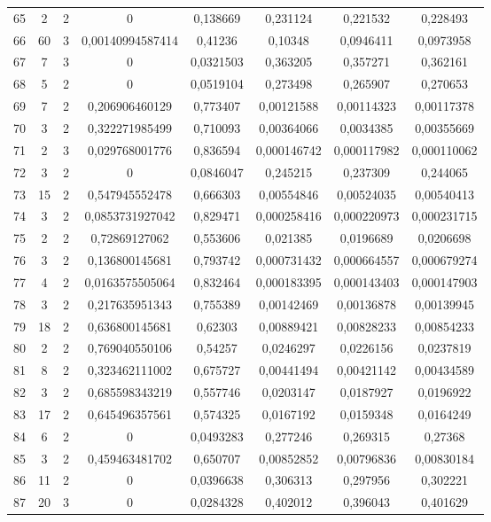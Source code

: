 \begin{longtable}{|c|c|c|c|c|c|c|c|}
65 & 2 & 2 & 0 & 0,138669 & 0,231124 & 0,221532 & 0,228493  \\
66 & 60 & 3 & 0,00140994587414 & 0,41236 & 0,10348 & 0,0946411 & 0,0973958  \\
67 & 7 & 3 & 0 & 0,0321503 & 0,363205 & 0,357271 & 0,362161  \\
68 & 5 & 2 & 0 & 0,0519104 & 0,273498 & 0,265907 & 0,270653  \\
69 & 7 & 2 & 0,206906460129 & 0,773407 & 0,00121588 & 0,00114323 & 0,00117378  \\
70 & 3 & 2 & 0,322271985499 & 0,710093 & 0,00364066 & 0,0034385 & 0,00355669  \\
71 & 2 & 3 & 0,029768001776 & 0,836594 & 0,000146742 & 0,000117982 & 0,000110062  \\
72 & 3 & 2 & 0 & 0,0846047 & 0,245215 & 0,237309 & 0,244065  \\
73 & 15 & 2 & 0,547945552478 & 0,666303 & 0,00554846 & 0,00524035 & 0,00540413  \\
74 & 3 & 2 & 0,0853731927042 & 0,829471 & 0,000258416 & 0,000220973 & 0,000231715  \\
75 & 2 & 2 & 0,72869127062 & 0,553606 & 0,021385 & 0,0196689 & 0,0206698  \\
76 & 3 & 2 & 0,136800145681 & 0,793742 & 0,000731432 & 0,000664557 & 0,000679274  \\
77 & 4 & 2 & 0,0163575505064 & 0,832464 & 0,000183395 & 0,000143403 & 0,000147903  \\
78 & 3 & 2 & 0,217635951343 & 0,755389 & 0,00142469 & 0,00136878 & 0,00139945  \\
79 & 18 & 2 & 0,636800145681 & 0,62303 & 0,00889421 & 0,00828233 & 0,00854233  \\
80 & 2 & 2 & 0,769040550106 & 0,54257 & 0,0246297 & 0,0226156 & 0,0237819  \\
81 & 8 & 2 & 0,323462111002 & 0,675727 & 0,00441494 & 0,00421142 & 0,00434589  \\
82 & 3 & 2 & 0,685598343219 & 0,557746 & 0,0203147 & 0,0187927 & 0,0196922  \\
83 & 17 & 2 & 0,645496357561 & 0,574325 & 0,0167192 & 0,0159348 & 0,0164249  \\
84 & 6 & 2 & 0 & 0,0493283 & 0,277246 & 0,269315 & 0,27368  \\
85 & 3 & 2 & 0,459463481702 & 0,650707 & 0,00852852 & 0,00796836 & 0,00830184  \\
86 & 11 & 2 & 0 & 0,0396638 & 0,306313 & 0,297956 & 0,302221  \\
87 & 20 & 3 & 0 & 0,0284328 & 0,402012 & 0,396043 & 0,401629  \\

\end{longtable}
